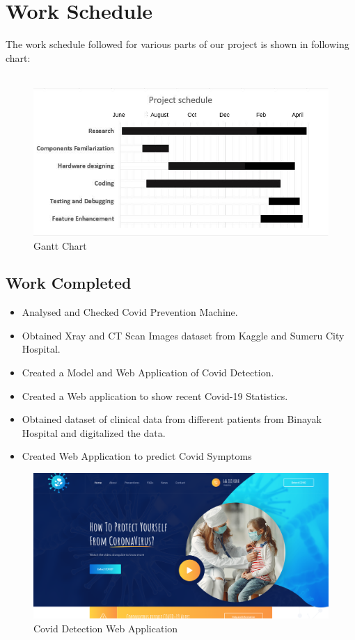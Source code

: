 \documentclass[a4paper,12pt]{report}
\begin{document}
\section{Work Schedule}
 The work schedule followed for various parts of our project is shown in following chart:\\ \\
 \begin{figure}[h]  %
   \begin{center}
   \includegraphics[scale=0.5]{gantt.jpg}
   \caption{Gantt Chart}
  \end{center}
  \end{figure}
  \pagebreak
  \subsection{Work Completed}
  \begin{itemize}
\item Analysed and Checked Covid Prevention Machine.
\item Obtained Xray and CT Scan Images dataset from Kaggle and Sumeru City Hospital.
\item Created a Model and Web Application of Covid Detection.
\item Created a Web application to show recent Covid-19 Statistics.
\item Obtained dataset of clinical data from different patients from Binayak Hospital and digitalized the data.
\item Created Web Application to predict Covid Symptoms
\end{itemize}

\begin{figure}[h]  %
   \begin{center}
   \includegraphics[scale=0.2]{detect.png}
   \caption{Covid Detection Web Application}
  \end{center}
  \end{figure}
\end{document}
